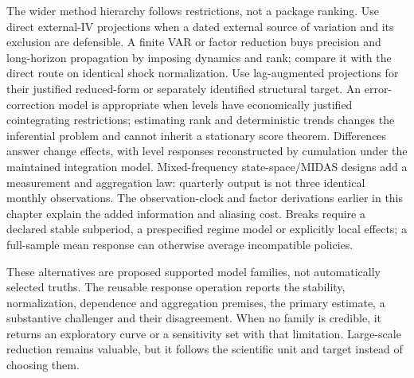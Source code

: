 The wider method hierarchy follows restrictions, not a package ranking.
Use direct external-IV projections when a dated external source of variation
and its exclusion are defensible. A finite VAR or factor reduction buys
precision and long-horizon propagation by imposing dynamics and rank; compare
it with the direct route on identical shock normalization. Use lag-augmented
projections for their justified reduced-form or separately identified
structural target. An error-correction model is appropriate when levels have
economically justified cointegrating restrictions; estimating rank and
deterministic trends changes the inferential problem and cannot inherit a
stationary score theorem. Differences answer change effects, with level
responses reconstructed by cumulation under the maintained integration
model. Mixed-frequency state-space/MIDAS designs add a measurement and
aggregation law: quarterly output is not three identical monthly observations.
The observation-clock and factor derivations earlier in this chapter explain
the added information and aliasing cost. Breaks require a declared stable
subperiod, a prespecified regime model or explicitly local effects; a
full-sample mean response can otherwise average incompatible policies.

These alternatives are proposed supported model families, not automatically
selected truths. The reusable response operation reports the stability,
normalization, dependence and aggregation premises, the primary estimate,
a substantive challenger and their disagreement. When no family is credible,
it returns an exploratory curve or a sensitivity set with that limitation.
Large-scale reduction remains valuable, but it follows the scientific unit
and target instead of choosing them.

